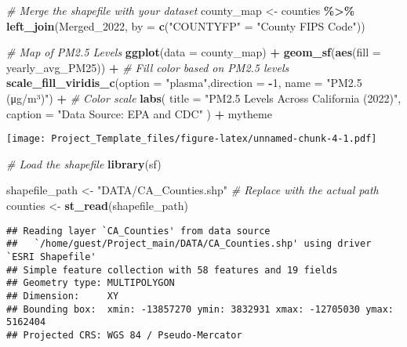 \documentclass[
]{article}
\newenvironment{Shaded}{\begin{snugshade}}{\end{snugshade}}
\newcommand{\AttributeTok}[1]{\textcolor[rgb]{0.13,0.29,0.53}{#1}}
\newcommand{\CommentTok}[1]{\textcolor[rgb]{0.56,0.35,0.01}{\textit{#1}}}
\newcommand{\DecValTok}[1]{\textcolor[rgb]{0.00,0.00,0.81}{#1}}
\newcommand{\FunctionTok}[1]{\textcolor[rgb]{0.13,0.29,0.53}{\textbf{#1}}}
\newcommand{\NormalTok}[1]{#1}
\newcommand{\OtherTok}[1]{\textcolor[rgb]{0.56,0.35,0.01}{#1}}
\newcommand{\SpecialCharTok}[1]{\textcolor[rgb]{0.81,0.36,0.00}{\textbf{#1}}}
\newcommand{\StringTok}[1]{\textcolor[rgb]{0.31,0.60,0.02}{#1}}
\begin{document}
\begin{Shaded}
\begin{Highlighting}[]
\CommentTok{\# Merge the shapefile with your dataset}
\NormalTok{county\_map }\OtherTok{\textless{}{-}}\NormalTok{ counties }\SpecialCharTok{\%\textgreater{}\%}
  \FunctionTok{left\_join}\NormalTok{(Merged\_2022, }\AttributeTok{by =} \FunctionTok{c}\NormalTok{(}\StringTok{"COUNTYFP"} \OtherTok{=} \StringTok{"County FIPS Code"}\NormalTok{))}

\CommentTok{\# Map of PM2.5 Levels}
\FunctionTok{ggplot}\NormalTok{(}\AttributeTok{data =}\NormalTok{ county\_map) }\SpecialCharTok{+}
  \FunctionTok{geom\_sf}\NormalTok{(}\FunctionTok{aes}\NormalTok{(}\AttributeTok{fill =}\NormalTok{ yearly\_avg\_PM25)) }\SpecialCharTok{+}  \CommentTok{\# Fill color based on PM2.5 levels}
  \FunctionTok{scale\_fill\_viridis\_c}\NormalTok{(}\AttributeTok{option =} \StringTok{"plasma"}\NormalTok{,}\AttributeTok{direction =} \SpecialCharTok{{-}}\DecValTok{1}\NormalTok{, }\AttributeTok{name =} \StringTok{"PM2.5 (μg/m³)"}\NormalTok{) }\SpecialCharTok{+}  \CommentTok{\# Color scale}
  \FunctionTok{labs}\NormalTok{(}
    \AttributeTok{title =} \StringTok{"PM2.5 Levels Across California (2022)"}\NormalTok{,}
    \AttributeTok{caption =} \StringTok{"Data Source: EPA and CDC"}
\NormalTok{  ) }\SpecialCharTok{+}
\NormalTok{  mytheme}
\end{Highlighting}
\end{Shaded}

\texttt{[image: Project\_Template\_files/figure-latex/unnamed-chunk-4-1.pdf]}

\begin{Shaded}
\begin{Highlighting}[]
\CommentTok{\# Load the shapefile}
\FunctionTok{library}\NormalTok{(sf) }

\NormalTok{shapefile\_path }\OtherTok{\textless{}{-}} \StringTok{"DATA/CA\_Counties.shp"}  \CommentTok{\# Replace with the actual path}
\NormalTok{counties }\OtherTok{\textless{}{-}} \FunctionTok{st\_read}\NormalTok{(shapefile\_path)}
\end{Highlighting}
\end{Shaded}

\begin{verbatim}
## Reading layer `CA_Counties' from data source 
##   `/home/guest/Project_main/DATA/CA_Counties.shp' using driver `ESRI Shapefile'
## Simple feature collection with 58 features and 19 fields
## Geometry type: MULTIPOLYGON
## Dimension:     XY
## Bounding box:  xmin: -13857270 ymin: 3832931 xmax: -12705030 ymax: 5162404
## Projected CRS: WGS 84 / Pseudo-Mercator
\end{verbatim}
\end{document}
